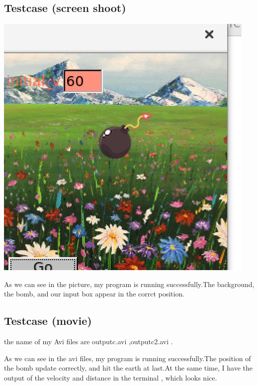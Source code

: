 \documentclass{article}
\begin{document}
\subsection*{Testcase (screen shoot)}
\includegraphics{te.png}
\begin{description}
	\item As we can see in the picture, my program is running successfully.The background, the bomb, and our input box appear in the corrct position.
\end{description}
\subsection*{Testcase (movie)}
\begin{description}
	\item the name of my Avi files are outputc.avi ,outputc2.avi .
	\item As we can see in the avi files, my program is running successfully.The position of the bomb update correctly, and hit the earth at last.At the same time, I have the output of the velocity and distance in the terminal , which looks nice.
\end{description}
\end{document}
